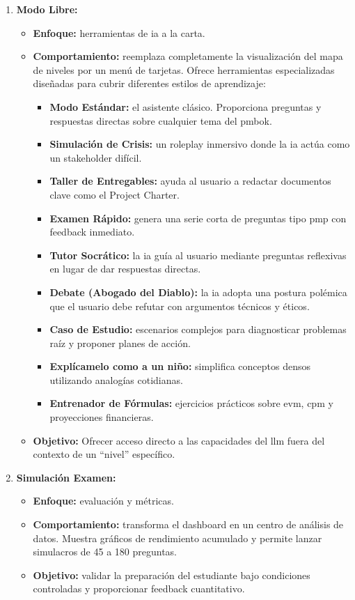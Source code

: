 \begin{enumerate}
    \item \textbf{Modo Libre:}
    \begin{itemize}
        \item \textbf{Enfoque:} herramientas de \gls{ia} a la carta.
        \item \textbf{Comportamiento:} reemplaza completamente la visualización del mapa de niveles por un menú de tarjetas. Ofrece herramientas especializadas diseñadas para cubrir diferentes estilos de aprendizaje:
        \begin{itemize}
            \item \textbf{Modo Estándar:} el asistente clásico. Proporciona preguntas y respuestas directas sobre cualquier tema del \gls{pmbok}.
            \item \textbf{Simulación de Crisis:} un roleplay inmersivo donde la \gls{ia} actúa como un stakeholder difícil.
            \item \textbf{Taller de Entregables:} ayuda al usuario a redactar documentos clave como el Project Charter.
            \item \textbf{Examen Rápido:} genera una serie corta de preguntas tipo \gls{pmp} con feedback inmediato.
            \item \textbf{Tutor Socrático:} la \gls{ia} guía al usuario mediante preguntas reflexivas en lugar de dar respuestas directas.
            \item \textbf{Debate (Abogado del Diablo):} la \gls{ia} adopta una postura polémica que el usuario debe refutar con argumentos técnicos y éticos.
            \item \textbf{Caso de Estudio:} escenarios complejos para diagnosticar problemas raíz y proponer planes de acción.
            \item \textbf{Explícamelo como a un niño:} simplifica conceptos densos utilizando analogías cotidianas.
            \item \textbf{Entrenador de Fórmulas:} ejercicios prácticos sobre \gls{evm}, \gls{cpm} y proyecciones financieras.
        \end{itemize}
        \item \textbf{Objetivo:} Ofrecer acceso directo a las capacidades del \gls{llm} fuera del contexto de un ``nivel'' específico.
    \end{itemize}

    \item \textbf{Simulación Examen:}
    \begin{itemize}
        \item \textbf{Enfoque:} evaluación y métricas.
        \item \textbf{Comportamiento:} transforma el dashboard en un centro de análisis de datos. Muestra gráficos de rendimiento acumulado y permite lanzar simulacros de 45 a 180 preguntas.
        \item \textbf{Objetivo:} validar la preparación del estudiante bajo condiciones controladas y proporcionar feedback cuantitativo.
    \end{itemize}
\end{enumerate}
